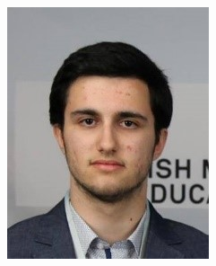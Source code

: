 \documentclass{cv}
\begin{document}
\begin{minipage}[l]{0.15\textwidth}
    \begin{center} \includegraphics[width=\textwidth]{img/cv_photo.jpg} \end{center}
\end{minipage}
\end{document}
